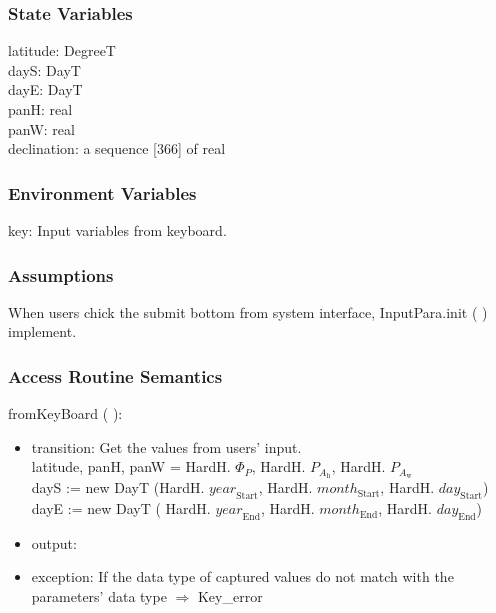 \documentclass[12pt, titlepage]{article}
\begin{document}
\subsubsection{State Variables}
latitude: DegreeT\\
dayS: DayT \\
dayE: DayT\\
panH: real\\
panW: real\\
declination: a sequence [366] of real


\subsubsection{Environment Variables}
key: Input variables from keyboard.

\subsubsection{Assumptions}
When users chick the submit bottom from system interface, InputPara.init ( ) implement.

\subsubsection{ Access Routine Semantics}

\noindent  fromKeyBoard ( ):
\begin{itemize}
\item transition: Get the values from users' input.\\
latitude, panH, panW = HardH. $\Phi_P$, HardH. $P_{A_{\text{h}}}$, HardH. $P_{A_{\text{w}}}$\\

dayS := new DayT (HardH. $\mathit{year}_\text{Start}$, HardH. $\mathit{month}_\text{Start}$, HardH. $\mathit{day}_\text{Start}$) \\

dayE :=  new DayT ( HardH. $\mathit{year}_\text{End}$, HardH. $\mathit{month}_\text{End}$, HardH. $\mathit{day}_\text{End}$)\\
\item output:
\item exception: If the data type of captured values do not match with the parameters' data type $\Rightarrow$ Key\_error
\end{itemize}
\end{document}
